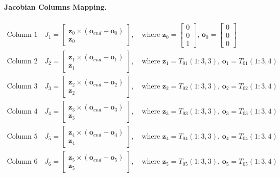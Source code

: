 \documentclass[11pt]{article}
\begin{document}
\paragraph{Jacobian Columns Mapping.}
\begin{align}
  \text{Column 1 (Joint 1):} \quad & J_1 = \begin{bmatrix} \mathbf{z}_0 \times (\mathbf{o}_{end} - \mathbf{o}_0) \\ \mathbf{z}_0 \end{bmatrix}, \quad \text{where } \mathbf{z}_0 = \begin{bmatrix}0\\0\\1\end{bmatrix}, \, \mathbf{o}_0 = \begin{bmatrix}0\\0\\0\end{bmatrix} \\
  \text{Column 2 (Joint 2):} \quad & J_2 = \begin{bmatrix} \mathbf{z}_1 \times (\mathbf{o}_{end} - \mathbf{o}_1) \\ \mathbf{z}_1 \end{bmatrix}, \quad \text{where } \mathbf{z}_1 = T_{01}(1:3,3), \, \mathbf{o}_1 = T_{01}(1:3,4) \\
  \text{Column 3 (Joint 3):} \quad & J_3 = \begin{bmatrix} \mathbf{z}_2 \times (\mathbf{o}_{end} - \mathbf{o}_2) \\ \mathbf{z}_2 \end{bmatrix}, \quad \text{where } \mathbf{z}_2 = T_{02}(1:3,3), \, \mathbf{o}_2 = T_{02}(1:3,4) \\
  \text{Column 4 (Joint 4):} \quad & J_4 = \begin{bmatrix} \mathbf{z}_3 \times (\mathbf{o}_{end} - \mathbf{o}_3) \\ \mathbf{z}_3 \end{bmatrix}, \quad \text{where } \mathbf{z}_3 = T_{03}(1:3,3), \, \mathbf{o}_3 = T_{03}(1:3,4) \\
  \text{Column 5 (Joint 5):} \quad & J_5 = \begin{bmatrix} \mathbf{z}_4 \times (\mathbf{o}_{end} - \mathbf{o}_4) \\ \mathbf{z}_4 \end{bmatrix}, \quad \text{where } \mathbf{z}_4 = T_{04}(1:3,3), \, \mathbf{o}_4 = T_{04}(1:3,4) \\
  \text{Column 6 (Joint 6):} \quad & J_6 = \begin{bmatrix} \mathbf{z}_5 \times (\mathbf{o}_{end} - \mathbf{o}_5) \\ \mathbf{z}_5 \end{bmatrix}, \quad \text{where } \mathbf{z}_5 = T_{05}(1:3,3), \, \mathbf{o}_5 = T_{05}(1:3,4)
\end{align}
\end{document}
